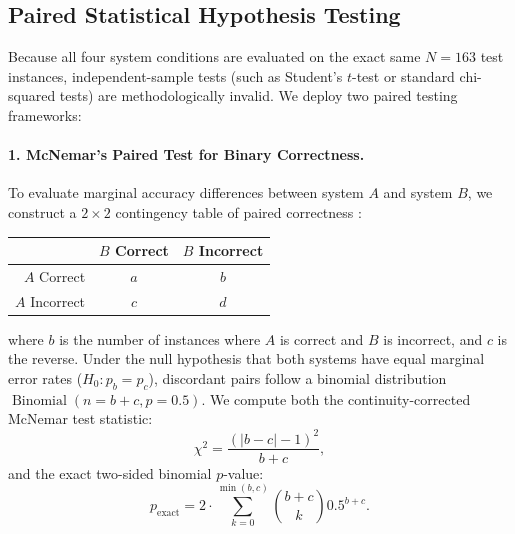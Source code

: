 \subsection{Paired Statistical Hypothesis Testing}
Because all four system conditions are evaluated on the exact same $N=163$ test instances, independent-sample tests (such as Student's $t$-test or standard chi-squared tests) are methodologically invalid. We deploy two paired testing frameworks:

\paragraph{1. McNemar's Paired Test for Binary Correctness.}
To evaluate marginal accuracy differences between system $A$ and system $B$, we construct a $2 \times 2$ contingency table of paired correctness \citep{mcnemar-1947}:
\begin{center}
\small
\begin{tabular}{rcc}
\toprule
 & $B$ Correct & $B$ Incorrect \\
\midrule
$A$ Correct & $a$ & $b$ \\
$A$ Incorrect & $c$ & $d$ \\
\bottomrule
\end{tabular}
\end{center}
where $b$ is the number of instances where $A$ is correct and $B$ is incorrect, and $c$ is the reverse. Under the null hypothesis that both systems have equal marginal error rates ($H_0: p_b = p_c$), discordant pairs follow a binomial distribution $\operatorname{Binomial}(n=b+c, p=0.5)$. We compute both the continuity-corrected McNemar test statistic:
\begin{equation}
    \chi^2 = \frac{(|b - c| - 1)^2}{b + c},
\end{equation}
and the exact two-sided binomial $p$-value:
\begin{equation}
    p_{\text{exact}} = 2 \cdot \sum_{k=0}^{\min(b, c)} \binom{b+c}{k} 0.5^{b+c}.
\end{equation}


